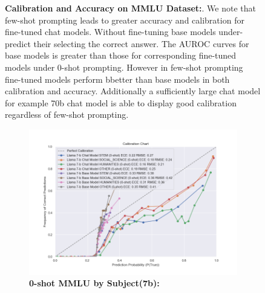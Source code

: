 \documentclass[11pt]{article}
\begin{document}
\begin{figure}
        \caption{\textbf{Calibration and Accuracy on MMLU Dataset:}. We note that few-shot prompting leads to greater accuracy and calibration for fine-tuned chat models. Without fine-tuning base models under-predict their selecting the correct answer. The AUROC curves for base models is greater than those for corresponding fine-tuned models under 0-shot prompting. However in few-shot prompting fine-tuned models perform bbetter than base models in both calibration and accuracy. Additionally a sufficiently large chat model for example 70b chat model is able to display good calibration regardless of few-shot prompting.}
        
        \label{fig:three graphs}
\end{figure}

\begin{figure}
     \centering
     \begin{subfigure}[b]{0.60\textwidth}
         \centering \includegraphics[width=1.1\textwidth]{figures/0-shot-MMLU-subjects-7b.png}
         \caption{\textbf{0-shot MMLU by Subject(7b):} }
         \label{fig:0-shot-MMLU}
     \end{subfigure}
     \hfill
     \begin{subfigure}[b]{0.38\textwidth}

\end{subfigure}
\end{figure}
\end{document}
